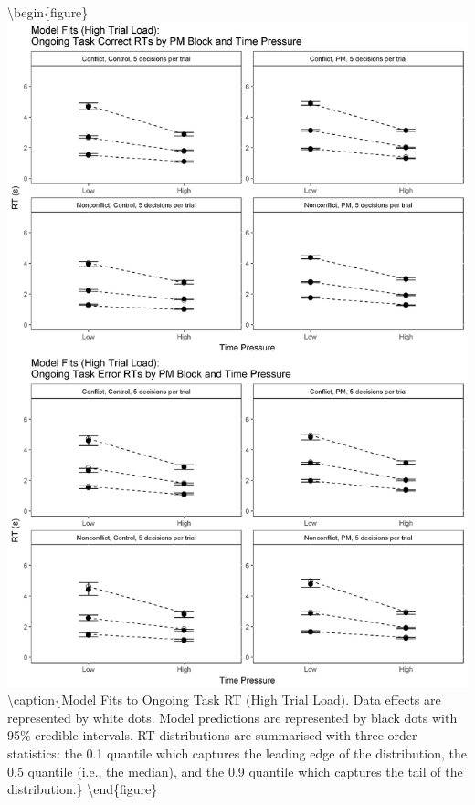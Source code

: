 \documentclass[11pt,]{article}
\begin{document}
\textbackslash{}begin\{figure\}
\includegraphics[width=0.8\linewidth]{figures/E1/E1.Fits.RT.Ongoing.5}
\textbackslash{}caption\{\label{fig:Fits.RT.Ongoing.5}Model Fits to
Ongoing Task RT (High Trial Load). Data effects are represented by white
dots. Model predictions are represented by black dots with 95\% credible
intervals. RT distributions are summarised with three order statistics:
the 0.1 quantile which captures the leading edge of the distribution,
the 0.5 quantile (i.e., the median), and the 0.9 quantile which captures
the tail of the
distribution.\}\label{fig:Fit Plot: RT Ongoing High Load}
\textbackslash{}end\{figure\}
\end{document}

